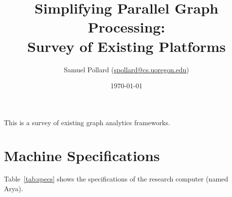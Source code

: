 \documentclass[11pt]{article}
\begin{document}
\title{Simplifying Parallel Graph Processing: \\
	\large Survey of Existing Platforms
}
\author{Samuel Pollard (\href{mailto:spollard@cs.uoregon.edu}{spollard@cs.uoregon.edu})}
\date{\today}
\maketitle

This is a survey of existing graph analytics frameworks.

\section{Machine Specifications}
Table~\ref{tab:specs} shows the specifications of the research computer (named Arya).

\begin{table}[!htb]
	\centering

	\caption{Machine specifications. The disparity between the CPU's advertised clock speed and the ``CPU Clock'' row is a result of the Turbo Boost technology which can increase the clock speed to a limit. The manufacturer's published maximum clock speeds can be found at \url{http://ark.intel.com}.}
	\label{tab:specs}
\end{table}

\end{document}
